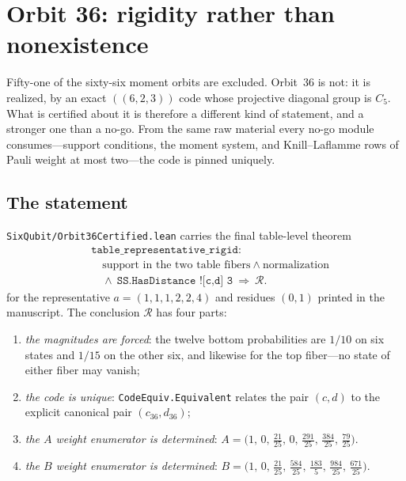 \documentclass[11pt,a4paper]{article}
\newcommand{\lean}[1]{\texttt{#1}}
\theoremstyle{definition}
\begin{document}
\section{Orbit 36: rigidity rather than nonexistence}
\label{sec:orbit36}

Fifty-one of the sixty-six moment orbits are excluded. Orbit~36 is not: it is
realized, by an exact $((6,2,3))$ code whose projective diagonal group is
$C_5$. What is certified about it is therefore a different kind of statement,
and a stronger one than a no-go. From the same raw material every no-go module
consumes---support conditions, the moment system, and Knill--Laflamme rows of
Pauli weight at most two---the code is pinned uniquely.

\subsection{The statement}

\lean{SixQubit/Orbit36Certified.lean} carries the final table-level theorem
\[
  \begin{aligned}
  &\lean{table\_representative\_rigid}:\\
  &\quad \text{support in the two table fibers}
    \ \wedge\ \text{normalization}\\
  &\quad \wedge\ \lean{SS.HasDistance ![c,d] 3}
    \ \Longrightarrow\ \mathcal{R}.
  \end{aligned}
\]
for the representative $a=(1,1,1,2,2,4)$ and residues $(0,1)$ printed in the
manuscript.  The conclusion $\mathcal{R}$ has four parts:

\begin{enumerate}
\item \emph{the magnitudes are forced}: the twelve bottom probabilities are
      $1/10$ on six states and $1/15$ on the other six, and likewise for the
      top fiber---no state of either fiber may vanish;
\item \emph{the code is unique}:
      \lean{CodeEquiv.Equivalent} relates the pair $(c,d)$ to the explicit
      canonical pair $(c_{36}, d_{36})$;
\item \emph{the $A$ weight enumerator is determined}:
      $A = \bigl(1,\,0,\,\tfrac{21}{25},\,0,\,\tfrac{291}{25},\,
      \tfrac{384}{25},\,\tfrac{79}{25}\bigr)$.
\item \emph{the $B$ weight enumerator is determined}:
      $B = \bigl(1,\,0,\,\tfrac{21}{25},\,\tfrac{584}{25},\,
      \tfrac{183}{5},\,\tfrac{984}{25},\,\tfrac{671}{25}\bigr)$.
\end{enumerate}
\end{document}
